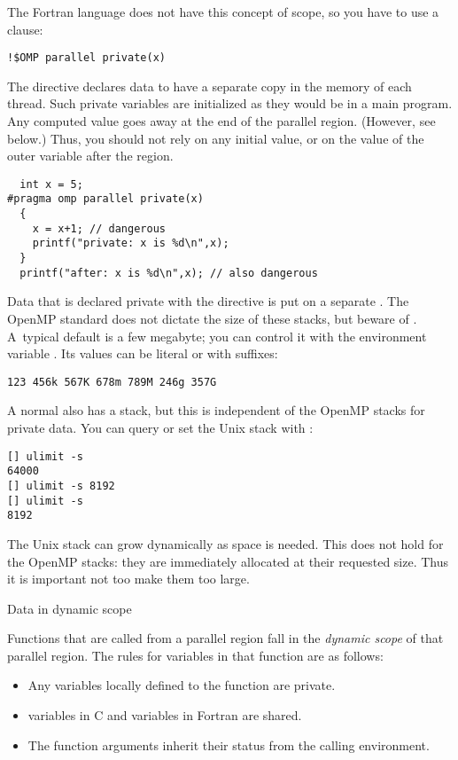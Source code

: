 The Fortran language does not have this concept of scope, so you have to use a
 clause:
\begin{lstlisting}
!$OMP parallel private(x)
\end{lstlisting}

The  directive declares data to have a separate copy 
in the memory of each thread. 
Such private variables are initialized as they would be in a main program.
Any computed value goes away at the end 
of the parallel region. (However, see below.)
Thus, you should not rely on any initial value, or on the value of the outer variable
after the region.

\begin{lstlisting}
  int x = 5;
#pragma omp parallel private(x)
  {
    x = x+1; // dangerous
    printf("private: x is %d\n",x);
  }
  printf("after: x is %d\n",x); // also dangerous
\end{lstlisting}

Data that is declared private with the  directive is
put on a separate . The OpenMP standard
does not dictate the size of these stacks, but beware of .
A~typical default
is a few megabyte; you can control it with the environment variable
. Its values can be literal or with suffixes:
\begin{verbatim}
123 456k 567K 678m 789M 246g 357G
\end{verbatim}

A normal  also has a stack, but this is
independent of the OpenMP stacks for private data. You can query or
set the Unix stack with :
\begin{verbatim}
[] ulimit -s
64000
[] ulimit -s 8192
[] ulimit -s
8192
\end{verbatim}
The Unix stack can grow dynamically as space is needed. This does not
hold for the OpenMP stacks: they are immediately allocated at their
requested size. Thus it is important not too make them too large.

 {Data in dynamic scope}

Functions that are called from a parallel region fall in the
\emph{dynamic scope} of that
parallel region. The rules for variables in that function are as follows:
\begin{itemize}
\item Any variables locally defined to the function are private.
\item {} variables in C and  variables in Fortran
  are shared.
\item The function arguments inherit their status from the calling environment.
\end{itemize}

